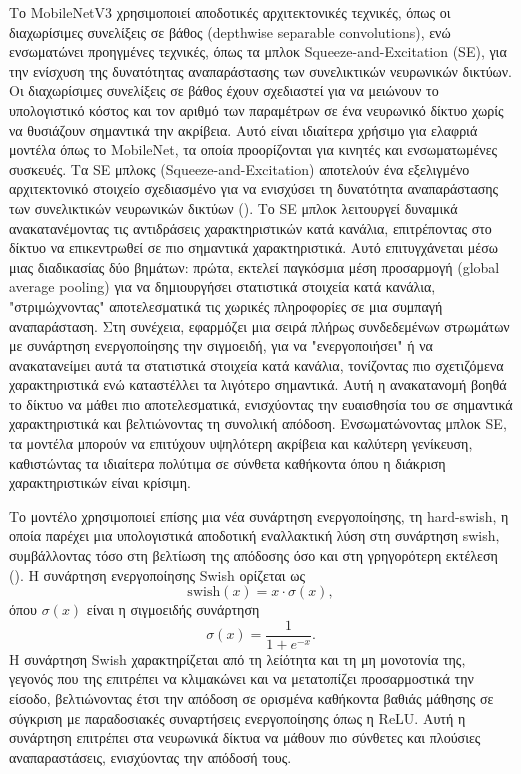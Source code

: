 Το MobileNetV3 χρησιμοποιεί αποδοτικές αρχιτεκτονικές τεχνικές, όπως οι διαχωρίσιμες συνελίξεις σε βάθος (depthwise separable convolutions), ενώ ενσωματώνει προηγμένες τεχνικές, όπως τα μπλοκ Squeeze-and-Excitation (SE), για την ενίσχυση της δυνατότητας αναπαράστασης των συνελικτικών νευρωνικών δικτύων. Οι διαχωρίσιμες συνελίξεις σε βάθος έχουν σχεδιαστεί για να μειώνουν το υπολογιστικό κόστος και τον αριθμό των παραμέτρων σε ένα νευρωνικό δίκτυο χωρίς να θυσιάζουν σημαντικά την ακρίβεια. Αυτό είναι ιδιαίτερα χρήσιμο για ελαφριά μοντέλα όπως το MobileNet, τα οποία προορίζονται για κινητές και ενσωματωμένες συσκευές. Τα SE μπλοκς (Squeeze-and-Excitation) αποτελούν ένα εξελιγμένο αρχιτεκτονικό στοιχείο σχεδιασμένο για να ενισχύσει τη δυνατότητα αναπαράστασης των συνελικτικών νευρωνικών δικτύων (). Το SE μπλοκ λειτουργεί δυναμικά ανακατανέμοντας τις αντιδράσεις χαρακτηριστικών κατά κανάλια, επιτρέποντας στο δίκτυο να επικεντρωθεί σε πιο σημαντικά χαρακτηριστικά. Αυτό επιτυγχάνεται μέσω μιας διαδικασίας δύο βημάτων: πρώτα, εκτελεί παγκόσμια μέση προσαρμογή (global average pooling) για να δημιουργήσει στατιστικά στοιχεία κατά κανάλια, "στριμώχνοντας" αποτελεσματικά τις χωρικές πληροφορίες σε μια συμπαγή αναπαράσταση. Στη συνέχεια, εφαρμόζει μια σειρά πλήρως συνδεδεμένων στρωμάτων με συνάρτηση ενεργοποίησης την σιγμοειδή, για να "ενεργοποιήσει" ή να ανακατανείμει αυτά τα στατιστικά στοιχεία κατά κανάλια, τονίζοντας πιο σχετιζόμενα χαρακτηριστικά ενώ καταστέλλει τα λιγότερο σημαντικά. Αυτή η ανακατανομή βοηθά το δίκτυο να μάθει πιο αποτελεσματικά, ενισχύοντας την ευαισθησία του σε σημαντικά χαρακτηριστικά και βελτιώνοντας τη συνολική απόδοση. Ενσωματώνοντας μπλοκ SE, τα μοντέλα μπορούν να επιτύχουν υψηλότερη ακρίβεια και καλύτερη γενίκευση, καθιστώντας τα ιδιαίτερα πολύτιμα σε σύνθετα καθήκοντα όπου η διάκριση χαρακτηριστικών είναι κρίσιμη.

Το μοντέλο χρησιμοποιεί επίσης μια νέα συνάρτηση ενεργοποίησης, τη hard-swish, η οποία παρέχει μια υπολογιστικά αποδοτική εναλλακτική λύση στη συνάρτηση swish, συμβάλλοντας τόσο στη βελτίωση της απόδοσης όσο και στη γρηγορότερη εκτέλεση (). Η συνάρτηση ενεργοποίησης Swish ορίζεται ως
\[
\text{swish}(x) = x \cdot \sigma(x),
\]
όπου \(\sigma(x)\) είναι η σιγμοειδής συνάρτηση
\[
\sigma(x) = \frac{1}{1 + e^{-x}}.
\]
Η συνάρτηση Swish χαρακτηρίζεται από τη λείότητα και τη μη μονοτονία της, γεγονός που της επιτρέπει να κλιμακώνει και να μετατοπίζει προσαρμοστικά την είσοδο, βελτιώνοντας έτσι την απόδοση σε ορισμένα καθήκοντα βαθιάς μάθησης σε σύγκριση με παραδοσιακές συναρτήσεις ενεργοποίησης όπως η ReLU. Αυτή η συνάρτηση επιτρέπει στα νευρωνικά δίκτυα να μάθουν πιο σύνθετες και πλούσιες αναπαραστάσεις, ενισχύοντας την απόδοσή τους.

